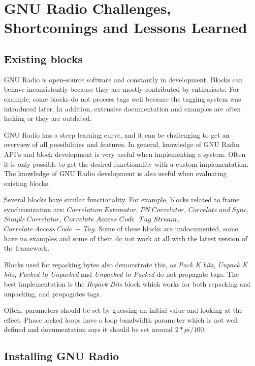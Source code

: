 \section{GNU Radio Challenges, Shortcomings and Lessons Learned }


\subsection{Existing blocks}
GNU Radio is open-source software and constantly in development. Blocks can behave inconsistently because they are mostly contributed by enthusiasts. For example, some blocks do not process tags well because the tagging system was introduced later. In addition, extensive documentation and examples are often lacking or they are outdated. \medskip


GNU Radio has a steep learning curve, and it can be challenging to get an overview of all possibilities and features. In general, knowledge of GNU Radio API's and block development is very useful when implementing a system. Often it is only possible to get the desired functionality with a custom implementation. The knowledge of GNU Radio development is also useful when evaluating existing blocks.\medskip

Several blocks have similar functionality. For example, blocks related to frame synchronization are: $Correlation\ Estimator$, $PN\ Correlator$, $Correlate\ and\ Sync$, $Simple\ Correlator$, $Correlate\ Access\ Code\ \-\ Tag\ Stream$, $Correlate\ Access\ Code\ -\ Tag$. %
Some of these blocks are undocumented, some have no examples and some of them do not work at all with the latest version of the framework. \medskip

Blocks used for repacking bytes also demonstrate this, as \textit{Pack K bits}, \textit{Unpack K bits}, \textit{Packed to Unpacked} and \textit{Unpacked to Packed} do not propagate tags. The best implementation is the \textit{Repack Bits} block which works for both repacking and unpacking, and propagates tags.\medskip

Often, parameters should be set by guessing an initial value and looking at the effect. Phase locked loops have  a loop bandwidth parameter which is not well defined and documentation says it should be set around $2*pi/100$. \medskip


\subsection{Installing GNU Radio}

